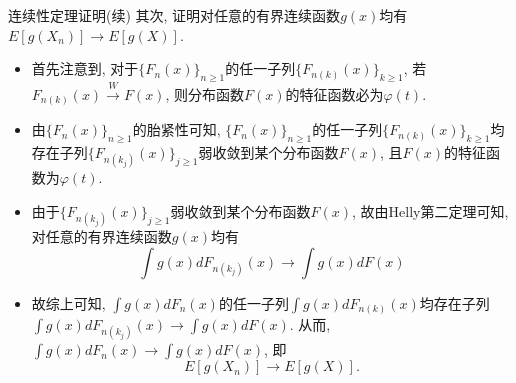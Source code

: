 \documentclass[Prob-All.tex]{subfiles}
\begin{document}
\begin{frame}{连续性定理证明(续)}
其次, 证明对任意的有界连续函数$g(x)$均有 $E[g(X_n)]\rightarrow E[g(X)]$. \pause
\begin{itemize}[<+-|alert@+>]
\item 首先注意到, 对于$\{F_n(x)\}_{n\geq 1}$的任一子列$\{F_{n(k)}(x)\}_{k\geq 1}$, 若$F_{n(k)} (x)\stackrel{W}{\rightarrow} F (x)$, 则分布函数$F(x)$的特征函数必为$\varphi(t)$.
\item 由$\{F_n(x)\}_{n\geq 1}$的胎紧性可知, $\{F_n(x)\}_{n\geq 1}$的任一子列$\{F_{n(k)}(x)\}_{k\geq 1}$均存在子列$\{F_{n(k_j)}(x)\}_{j\geq 1}$弱收敛到某个分布函数$F(x)$, 且$F(x)$的特征函数为$\varphi(t)$.

\item 由于$\{F_{n(k_j)}(x)\}_{j\geq 1}$弱收敛到某个分布函数$F(x)$, 故由Helly第二定理可知, 对任意的有界连续函数$g(x)$均有
\[\int g(x)dF_{n(k_j)}(x)\rightarrow \int g(x)dF(x)\]

\item 故综上可知, $\int g(x)dF_{n}(x)$的任一子列$\int g(x)dF_{n(k)}(x)$均存在子列$\int g(x)dF_{n(k_j)}(x)\rightarrow \int g(x)dF(x)$. 从而, $\int g(x)dF_{n}(x)\rightarrow \int g(x)dF(x)$, 即 $$E[g(X_n)]\rightarrow E[g(X)].$$
\end{itemize}

\end{frame}





\end{document}
